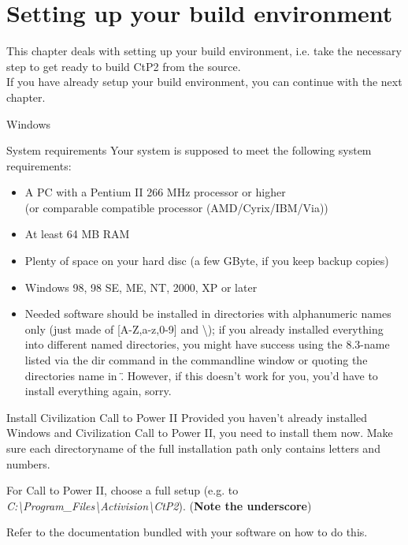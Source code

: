 \chapter{Setting up your build environment\label{toc:setupbenv}}
This chapter deals with setting up your build environment, i.e. take the necessary step to get ready to build CtP2 from the source.\\
If you have already setup your build environment, you can continue with the next chapter.
\begin{section}{Windows}
\begin{subsection}{System requirements}
Your system is supposed to meet the following system requirements:
\begin{itemize}
\item A PC with a Pentium II 266 MHz processor or higher\\
(or comparable compatible processor (AMD/Cyrix/IBM/Via))
\item At least 64 MB RAM
\item Plenty of space on your hard disc (a few GByte, if you keep backup copies)
\item Windows 98, 98 SE, ME, NT, 2000, XP or later
\item Needed software should be installed in directories with alphanumeric names only (just made of [A-Z,a-z,0-9] and \textbackslash{});
if you already installed everything into different named directories, you might have success using the 8.3-name listed via the dir command in the commandline window or quoting the directories name in \". However, if this doesn't work for you, you'd have to install everything again, sorry.
\end{itemize}
\end{subsection}%

\begin{subsection}{Install Civilization Call to Power II}
Provided you haven't already installed Windows and Civilization Call to Power II, you need to install them now. Make sure each directoryname of the full installation path only contains letters and numbers.

For Call to Power II, choose a full setup (e.g. to \textit{C:\textbackslash{}Program\_Files\textbackslash{}Activision\textbackslash{}CtP2}). (\textbf{Note the underscore})

Refer to the documentation bundled with your software on how to do this.
\end{subsection}%


\end{section}
